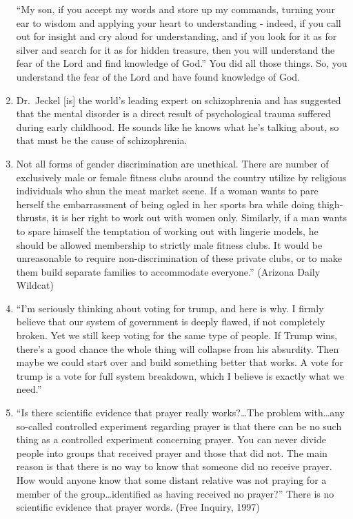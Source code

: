 \documentclass[
]{book}
\begin{document}
\begin{enumerate}
  ``My son, if you accept my words and store up my commands, turning your ear to wisdom and applying your heart to understanding - indeed, if you call out for insight and cry aloud for understanding, and if you look for it as for silver and search for it as for hidden treasure, then you will understand the fear of the Lord and find knowledge of God.'' You did all those things. So, you understand the fear of the Lord and have found knowledge of God.
\item
  Dr.~Jeckel {[}is{]} the world's leading expert on schizophrenia and has suggested that the mental disorder is a direct result of psychological trauma suffered during early childhood. He sounds like he knows what he's talking about, so that must be the cause of schizophrenia.
\item
  Not all forms of gender discrimination are unethical. There are number of exclusively male or female fitness clubs around the country utilize by religious individuals who shun the meat market scene. If a woman wants to pare herself the embarrassment of being ogled in her sports bra while doing thigh-thrusts, it is her right to work out with women only. Similarly, if a man wants to spare himself the temptation of working out with lingerie models, he should be allowed membership to strictly male fitness clubs. It would be unreasonable to require non-discrimination of these private clubs, or to make them build separate families to accommodate everyone.'' (Arizona Daily Wildcat)
\item
  ``I'm seriously thinking about voting for trump, and here is why. I firmly believe that our system of government is deeply flawed, if not completely broken. Yet we still keep voting for the same type of people. If Trump wins, there's a good chance the whole thing will collapse from his absurdity. Then maybe we could start over and build something better that works. A vote for trump is a vote for full system breakdown, which I believe is exactly what we need.''
\item
  ``Is there scientific evidence that prayer really works?\ldots The problem with\ldots any so-called controlled experiment regarding prayer is that there can be no such thing as a controlled experiment concerning prayer. You can never divide people into groups that received prayer and those that did not. The main reason is that there is no way to know that someone did no receive prayer. How would anyone know that some distant relative was not praying for a member of the group\ldots identified as having received no prayer?'' There is no scientific evidence that prayer words. (Free Inquiry, 1997)

\end{enumerate}
\end{document}
